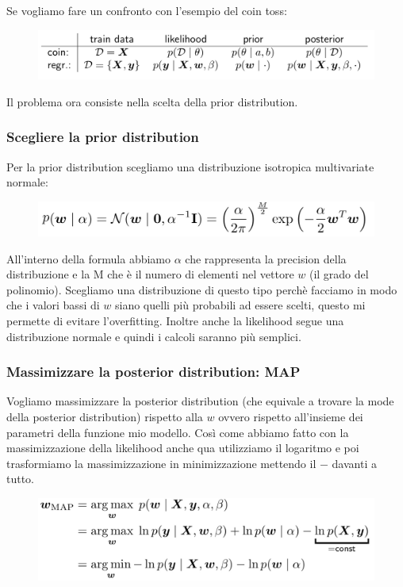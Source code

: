 \documentclass[14pt]{extreport}
\begin{document}
Se vogliamo fare un confronto con l'esempio del coin toss:
\begin{figure}[H]
\centering
\includegraphics[width=0.7\linewidth]{118.jpeg}
\end{figure}

Il problema ora consiste nella scelta della prior distribution.
\subsubsection{Scegliere la prior distribution}

Per la prior distribution scegliamo una distribuzione isotropica multivariate normale:

\begin{figure}[H]
\centering
\includegraphics[width=0.6\linewidth]{119.jpeg}
\end{figure}

All'interno della formula abbiamo $\alpha$ che rappresenta la precision della distribuzione e la M che è il numero di elementi nel vettore $w$ (il
grado del polinomio). Scegliamo una distribuzione di questo tipo perchè facciamo in modo che i valori bassi di $w$ siano quelli più probabili ad
essere scelti, questo mi permette di evitare l'overfitting. Inoltre anche la likelihood segue una distribuzione normale e quindi i calcoli saranno più
semplici.


\subsubsection{Massimizzare la posterior distribution: MAP}

Vogliamo massimizzare la posterior distribution (che equivale a trovare la mode della posterior distribution) rispetto alla $w$ ovvero rispetto
all'insieme dei parametri della funzione mio modello. Così come abbiamo fatto con la massimizzazione della likelihood anche qua utilizziamo il
logaritmo e poi trasformiamo la massimizzazione in minimizzazione mettendo il $-$ davanti a tutto.

\begin{figure}[H]
\centering
\includegraphics[width=0.7\linewidth]{120.jpeg}
\end{figure}
\end{document}
